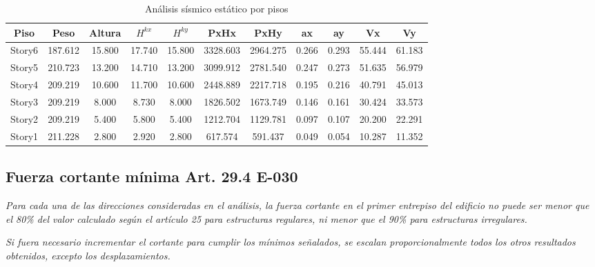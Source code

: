 \documentclass{article}%
\begin{document}
%


\begin{table}[H]%
\centering%
\caption{Análisis sísmico estático por pisos}%
\begin{tabular}{ccccccccccc}
\toprule
Piso & Peso & Altura & $H^{kx}$ & $H^{ky}$ & PxHx & PxHy & ax & ay & Vx & Vy \\
\midrule
Story6 & 187.612 & 15.800 & 17.740 & 15.800 & 3328.603 & 2964.275 & 0.266 & 0.293 & 55.444 & 61.183 \\
Story5 & 210.723 & 13.200 & 14.710 & 13.200 & 3099.912 & 2781.540 & 0.247 & 0.273 & 51.635 & 56.979 \\
Story4 & 209.219 & 10.600 & 11.700 & 10.600 & 2448.889 & 2217.718 & 0.195 & 0.216 & 40.791 & 45.013 \\
Story3 & 209.219 & 8.000 & 8.730 & 8.000 & 1826.502 & 1673.749 & 0.146 & 0.161 & 30.424 & 33.573 \\
Story2 & 209.219 & 5.400 & 5.800 & 5.400 & 1212.704 & 1129.781 & 0.097 & 0.107 & 20.200 & 22.291 \\
Story1 & 211.228 & 2.800 & 2.920 & 2.800 & 617.574 & 591.437 & 0.049 & 0.054 & 10.287 & 11.352 \\
\bottomrule
\end{tabular}
%
\end{table}

%
\subsection{Fuerza cortante mínima Art. 29.4 E{-}030}%
\label{subsec:FuerzacortantemnimaArt.29.4E{-}030}%
\begin{tcolorbox}[colback=gray!5!white,colframe=cyan!75!black,fonttitle=\bfseries,title=Art. 29.4.1]%
\textit{Para cada una de las direcciones consideradas en el análisis, la fuerza cortante en el primer entrepiso del edificio no puede ser menor que el 80\% del valor calculado según el artículo 25 para estructuras regulares, ni menor que el 90\% para estructuras irregulares.}%
\end{tcolorbox}%
\begin{tcolorbox}[colback=gray!5!white,colframe=cyan!75!black,fonttitle=\bfseries,title=Art. 29.4.2]%
\textit{Si fuera necesario incrementar el cortante para cumplir los mínimos señalados,  se escalan proporcionalmente todos los otros resultados obtenidos, excepto los  desplazamientos.}%
\end{tcolorbox}%
\end{document}
